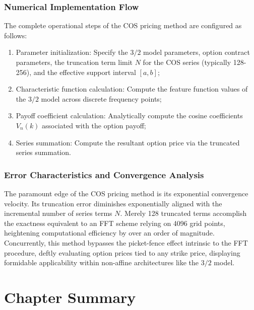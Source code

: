 \subsubsection{Numerical Implementation Flow}
The complete operational steps of the COS pricing method are configured as follows:
\begin{enumerate}
    \item Parameter initialization: Specify the $3/2$ model parameters, option contract parameters, the truncation term limit $N$ for the COS series (typically 128-256), and the effective support interval $[a,b]$;
    
    \item Characteristic function calculation: Compute the feature function values of the $3/2$ model across discrete frequency points;
    
    \item Payoff coefficient calculation: Analytically compute the cosine coefficients $V_n(k)$ associated with the option payoff;
    
    \item Series summation: Compute the resultant option price via the truncated series summation.
\end{enumerate}

\subsubsection{Error Characteristics and Convergence Analysis}
The paramount edge of the COS pricing method is its exponential convergence velocity. Its truncation error diminishes exponentially aligned with the incremental number of series terms $N$. Merely 128 truncated terms accomplish the exactness equivalent to an FFT scheme relying on 4096 grid points, heightening computational efficiency by over an order of magnitude. Concurrently, this method bypasses the picket-fence effect intrinsic to the FFT procedure, deftly evaluating option prices tied to any strike price, displaying formidable applicability within non-affine architectures like the $3/2$ model.

\section{Chapter Summary}


